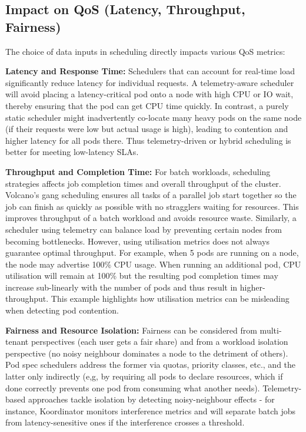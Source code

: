\subsection{Impact on QoS (Latency, Throughput, Fairness)}
The choice of data inputs in scheduling directly impacts various QoS metrics:

\textbf{Latency and Response Time:} Schedulers that can account for real-time
load significantly reduce latency for individual requests. A telemetry-aware
scheduler will avoid placing a latency-critical pod onto a node with high CPU or
IO wait, thereby ensuring that the pod can get CPU time quickly. In contrast, a
purely static scheduler might inadvertently co-locate many heavy pods on the same
node (if their requests were low but actual usage is high), leading to
contention and higher latency for all pods there. Thus telemetry-driven or
hybrid scheduling is better for meeting low-latency SLAs.

\textbf{Throughput and Completion Time:} For batch workloads, scheduling
strategies affects job completion times and overall throughput of the cluster.
Volcano's \cite{volcano_introduction} gang scheduling ensures all tasks of a
parallel job start together so the job can finish as quickly as possible with
no stragglers waiting for resources. This improves throughput of a batch
workload and avoids resource waste. Similarly, a scheduler using telemetry can
balance load by preventing certain nodes from becoming bottlenecks. However,
using utilisation metrics does not always guarantee optimal throughput. For
example, when 5 pods are running on a node, the node may advertise 100\% CPU
usage. When running an additional pod, CPU utilisation will remain at 100\% but
the resulting pod completion times may increase sub-linearly with the number of
pods and thus result in higher-throughput. This example highlights how
utilisation metrics can be misleading when detecting pod contention.

\textbf{Fairness and Resource Isolation:} Fairness can be considered from
multi-tenant perspectives (each user gets a fair share) and from a workload
isolation perspective (no noisy neighbour dominates a node to the detriment of
others). Pod spec schedulers address the former via quotas, priority classes,
etc., and the latter only indirectly (e,g, by requiring all pods to declare
resources, which if done correctly prevents one pod from consuming what another
needs). Telemetry-based approaches tackle isolation by detecting noisy-neighbour
effects - for instance, Koordinator monitors interference metrics and will
separate batch jobs from latency-senesitive ones if the interference crosses a
threshold.

